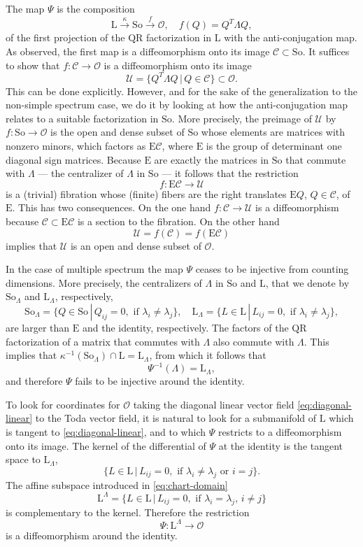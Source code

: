 \documentclass[reqno]{amsart}
\newcommand{\cC}{\mathcal{C}}
\newcommand{\cO}{\mathcal{O}}
\newcommand{\cU}{\mathcal{U}}
\newcommand{\E}{\mathrm{E}}
\newcommand{\So}{\mathrm{So}}
\renewcommand{\L}{\mathrm{L}}
\theoremstyle{definition} %
\begin{document}
The map $\Psi$ is the composition
\[\L\overset{\kappa}{\longrightarrow } \So\overset{f}{\longrightarrow} \cO,\quad f(Q)=Q^T\Lambda Q,\]
of the first projection of the $\mathrm{QR}$ factorization in $\L$ with the anti-conjugation map. As observed, the first map is a diffeomorphism onto its image $\cC\subset \So$. It suffices to show that $f:\cC\to\cO$ is a diffeomorphism onto its image
\[\cU=\{Q^T\Lambda Q\,|\, Q\in \cC\}\subset \cO.\]
This can be done explicitly. However, and for the sake of the generalization to the non-simple spectrum case, we do it by looking at how the anti-conjugation map relates to a suitable factorization in $\So$. More precisely,  the preimage of $\cU$ by $f:\So\to \cO$ is the open and dense subset of $\So$ whose elements are matrices with nonzero minors, which factors as $\E\cC$, where $\E$ is the group of determinant one diagonal sign matrices. Because $\E$ are exactly the matrices in $\So$ that commute with $\Lambda$ --- the centralizer of $\Lambda$ in $\So$ --- it follows that the restriction
\[f:\E\cC\longrightarrow\cU\]
is a (trivial) fibration whose (finite) fibers are the right translates $\E Q$, $Q\in \cC$, of $\E$. This has two consequences. On the one hand $f:\cC\to\cU$ is a diffeomorphism because $\cC\subset \E\cC$ is a section to the fibration. On the other hand
\[\cU=f(\cC)=f(\E\cC)\] implies that $\cU$ is an open and dense subset of $\cO$.





In the case of multiple spectrum the map $\Psi$ ceases to be injective from counting dimensions. More precisely, the centralizers of $\Lambda$ in $\So$ and $\L$, that we denote by $\So_\Lambda$ and $\L_\Lambda$, respectively,
\begin{equation}\label{eq:lower-triangular-centralizer}
\So_\Lambda=\{Q\in \So\,|\, Q_{ij}=0,\,\,\mathrm{if}\,\,\lambda_i\neq \lambda_j\},\quad \L_\Lambda=\{L\in \L\,|\, L_{ij}=0,\,\,\mathrm{if}\,\, \lambda_i\neq \lambda_j\},
\end{equation}
are larger than $\E$ and the identity, respectively. The factors of the  $\mathrm{QR}$ factorization of a matrix that commutes with $\Lambda$ also commute with $\Lambda$. This implies that   $\kappa^{-1}(\So_\Lambda)\cap \L=\L_\Lambda$, from which  it follows
that
\[\Psi^{-1}(\Lambda)=\L_\Lambda,\]
and therefore $\Psi$ fails to be injective around the identity.

To look for coordinates for $\cO$ taking the diagonal linear vector field \eqref{eq:diagonal-linear} to the Toda vector field, it is natural to look for a submanifold of $\L$ which is tangent to \eqref{eq:diagonal-linear}, and to which $\Psi$ restricts to a diffeomorphism onto its image. The kernel of the differential of $\Psi$ at the identity is the tangent space to $\L_\Lambda$,
\begin{equation*}
\{L\in \L\,|\, L_{ij}=0,\,\,\mathrm{if}\,\, \lambda_i\neq \lambda_j\,\,\mathrm{or}\,\,i=j\}.
\end{equation*}
The affine subspace introduced in \eqref{eq:chart-domain}
\[\L^\Lambda=\{L\in \L\,|\, L_{ij}=0,\,\,\mathrm{if}\,\, \lambda_i=\lambda_j,\,i\neq j\}\]
is complementary to the kernel. Therefore the restriction
\[\Psi:\L^\Lambda\longrightarrow\cO\]
is a diffeomorphism around the identity.
\end{document}
